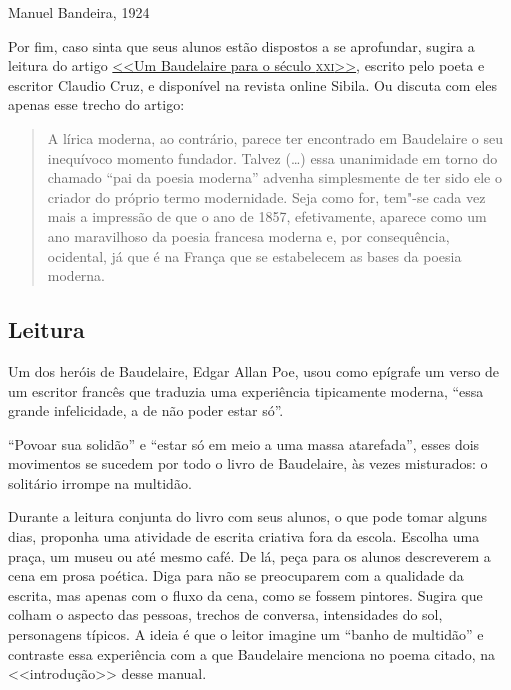 \documentclass[12pt]{extarticle}
\begin{document}
\bigskip \hfill Manuel Bandeira, 1924

\pagebreak

Por fim, caso sinta que seus alunos estão dispostos a se aprofundar, 
sugira a leitura do artigo \href{http://sibila.com.br/novos-e-criticos/um-baudelaire-para-o-seculo-xxi/3579}{<<Um Baudelaire para o século \textsc{xxi}>>}, 
escrito pelo poeta e escritor Claudio Cruz, e disponível na 
revista online Sibila.
Ou discuta com eles apenas esse trecho do artigo:



\begin{quote}
A lírica moderna, ao contrário, parece ter encontrado em Baudelaire 
o seu inequívoco momento fundador. Talvez (\ldots{})
essa unanimidade em torno do chamado ``pai da poesia moderna'' advenha simplesmente 
de ter sido ele o criador do próprio termo modernidade. Seja como for, 
tem"-se cada vez mais a impressão de que o ano de 1857, efetivamente, aparece como 
um ano maravilhoso da poesia francesa moderna e, por consequência, ocidental, já que 
é na França que se estabelecem as bases da poesia moderna.
\end{quote}

\subsection{Leitura}

Um dos heróis de Baudelaire, Edgar Allan Poe, usou como epígrafe um verso de 
um escritor francês que traduzia uma experiência tipicamente moderna, ``essa 
grande infelicidade, a de não poder estar só''.
 
``Povoar sua solidão'' e ``estar só em meio a uma massa atarefada'',  
esses dois movimentos se sucedem por todo o livro de Baudelaire, às vezes misturados:
o solitário irrompe na multidão.

Durante a leitura conjunta do livro com seus alunos, 
o que pode tomar alguns dias, proponha uma atividade de escrita criativa 
fora da escola. Escolha uma praça, um museu ou até mesmo café. De lá, peça para os 
alunos descreverem a cena em prosa poética. Diga para não se preocuparem com a qualidade
da escrita, mas apenas com o fluxo da cena, como se fossem pintores. Sugira que colham 
o aspecto das pessoas, trechos de conversa, intensidades do sol, personagens típicos.
A ideia é que o leitor imagine um ``banho de multidão'' e contraste essa experiência 
com a que Baudelaire menciona no poema citado, na <<introdução>> desse manual. 
\end{document}
